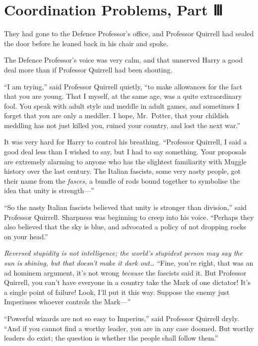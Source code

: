 \chapter{Coordination Problems, Part
Ⅲ}\label{coordination-problems-part}

They had gone to the Defence Professor's office, and Professor Quirrell
had sealed the door before he leaned back in his chair and spoke.

The Defence Professor's voice was very calm, and that unnerved Harry a
good deal more than if Professor Quirrell had been shouting.

``I am trying,'' said Professor Quirrell quietly, ``to make allowances
for the fact that you are young. That I myself, at the same age, was a
quite extraordinary fool. You speak with adult style and meddle in adult
games, and sometimes I forget that you are only a meddler. I hope,
Mr.~Potter, that your childish meddling has not just killed you, ruined
your country, and lost the next war.''

It was very hard for Harry to control his breathing. ``Professor
Quirrell, I said a good deal less than I wished to say, but I had to say
something. Your proposals are extremely alarming to anyone who has the
slightest familiarity with Muggle history over the last century. The
Italian fascists, some very nasty people, got their name from the
\emph{fasces,} a bundle of rods bound together to symbolise the idea
that unity is strength---''

``So the nasty Italian fascists believed that unity is stronger than
division,'' said Professor Quirrell. Sharpness was beginning to creep
into his voice. ``Perhaps they also believed that the sky is blue, and
advocated a policy of not dropping rocks on your head.''

\emph{Reversed stupidity is not intelligence; the world's stupidest
person may say the sun is shining, but that doesn't make it dark
out\ldots{}} ``Fine, you're right, that was an ad hominem argument, it's
not wrong \emph{because} the fascists said it. But Professor Quirrell,
you can't have everyone in a country take the Mark of one dictator! It's
a single point of failure! Look, I'll put it this way. Suppose the enemy
just Imperiuses whoever controls the Mark---''

``Powerful wizards are not so easy to Imperius,'' said Professor
Quirrell dryly. ``And if you cannot find a worthy leader, you are in any
case doomed. But worthy leaders do exist; the question is whether the
people shall follow them.''

